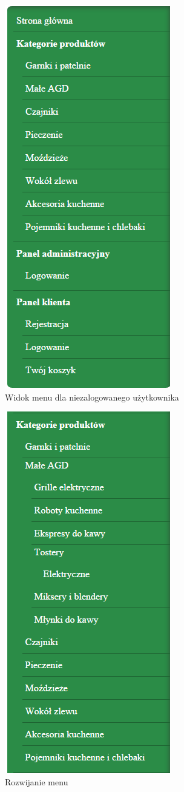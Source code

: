 \begin{figure}[H]
	\centering
	\includegraphics {fig/menu_nie_zalogowany}
	\caption{Widok menu dla niezalogowanego użytkownika}
	\label{fig:nie_zalogowany}
\end{figure}

\begin{figure}[H]
	\centering
	\includegraphics {fig/menu_rozwijanie}
	\caption{Rozwijanie menu}
	\label{fig:menu_rozwijalne}
\end{figure}
